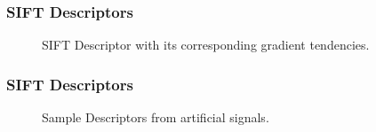 \documentclass[aspectratio=169]{beamer}
\begin{document}
    \begin{frame}
        \frametitle{SIFT Descriptors}
        \begin{center}
   			\begin{figure}[thpb]
      		\centering
      		\setlength\fboxsep{0pt}
	  		\setlength\fboxrule{0.5pt}
      		\caption{\centering  SIFT Descriptor with its corresponding gradient tendencies.}
      		\label{figure1}
   			\end{figure}        
        \end{center}
    \end{frame}   
    
    \begin{frame}
        \frametitle{SIFT Descriptors}
        \begin{center}
   			\begin{figure}[thpb]
      		\centering
      		\setlength\fboxsep{0pt}
	  		\setlength\fboxrule{0.5pt}
      		\caption{\centering Sample Descriptors from artificial signals.}
      		\label{figure1}
   			\end{figure}        
        \end{center}
    \end{frame}       
        
\end{document}
